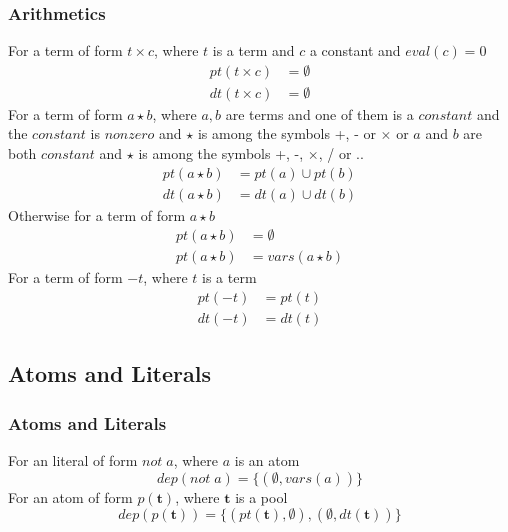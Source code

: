 \documentclass{article}
\newcommand{\pool}[1]{\boldsymbol{#1}}
\newcommand{\set}[1]{\{#1\}}
\newcommand{\dep}[2]{\{(#1), (#2)\}}
\begin{document}
	\subsubsection{Arithmetics}
	For a term of form $t \times c$, where $t$ is a term and $c$ a constant and $\mathit{eval}(c) = 0$
	\begin{align*}
		pt(t \times c) &= \emptyset \\
		dt(t \times c) &= \emptyset
	\end{align*}
	For a term of form $a \star b$, where $a,b$ are terms and one of them is a $\mathit{constant}$ and the $\mathit{constant}$ is $\mathit{nonzero}$ and $\star$ is among the symbols +, - or $\times$ or $a$ and $b$ are both $\mathit{constant}$ and $\star$ is among the symbols +, -, $\times$, / or ..
	\begin{align*}
		pt(a \star b) &= pt(a) \cup pt(b) \\
		dt(a \star b) &= dt(a) \cup dt(b)
	\end{align*}
	Otherwise for a term of form $a \star b$
	\begin{align*}
		pt(a \star b) &= \emptyset \\
		pt(a \star b) &= vars(a \star b)
	\end{align*}
	For a term of form $-t$, where $t$ is a term
	\begin{align*}
		pt(-t) &= pt(t) \\
		dt(-t) &= dt(t)
	\end{align*}

	\subsection{Atoms and Literals}
	\subsubsection{Atoms and Literals}
	For an literal of form $not \; a$, where $a$ is an atom
	\begin{equation*}
		dep(not \; a) = \set{(\emptyset, vars(a))}
	\end{equation*}
	For an atom of form $p(\pool{t})$, where $\pool{t}$ is a pool
	\begin{equation*}
		dep(p(\pool{t})) = \dep{pt(\pool{t}), \emptyset}{\emptyset, dt(\pool{t})}
	\end{equation*}
\end{document}
